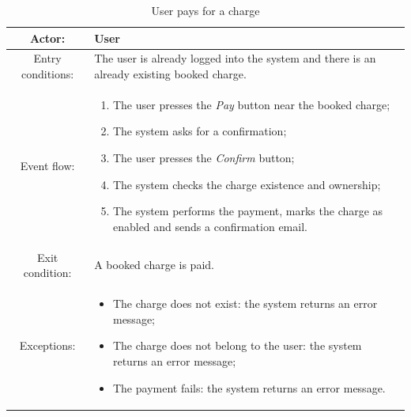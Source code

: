 \begin{table}[h]
    \begin{center}
        \begin{tabular}{|c||p{10cm}|}
            \hline
            Actor:            & User                                                                                       \\
            \hline
            Entry conditions: & The user is already logged into the system and there is an already existing booked charge. \\
            \hline
            Event flow:       &
            \begin{enumerate}
                \item The user presses the \textit{Pay} button near the booked charge;
                \item The system asks for a confirmation;
                \item The user presses the \textit{Confirm} button;
                \item The system checks the charge existence and ownership;
                \item The system performs the payment, marks the charge as enabled and sends a confirmation email.
            \end{enumerate}
            \\
            \hline
            Exit condition:   & A booked charge is paid.                                                                   \\
            \hline
            Exceptions:       &
            \begin{itemize}
                \item The charge does not exist: the system returns an error message;
                \item The charge does not belong to the user: the system returns an error message;
                \item The payment fails: the system returns an error message.
            \end{itemize}
            \\
            \hline
        \end{tabular}
    \end{center}
    \caption{User pays for a charge}
\end{table}


